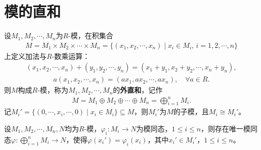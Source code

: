 \documentclass[../../main.tex]{subfiles}%
\begin{document}
\section{模的直和}

\begin{definition}
设$M_1,M_2,\cdots,M_n$为$R$-模，在积集合
\begin{align*}
M=M_1\times M_2\times\cdots\times M_n=\{(x_1,x_2,\cdots,x_n)\mid x_i\in M_i,\,i=1,2,\cdots,n\}
\end{align*}
上定义加法与$R$-数乘运算：
\begin{align}
(x_1,x_2,\cdots,x_n)+(y_1,y_2,\cdots,y_n)=(x_1+y_1,x_2+y_2,\cdots,x_n+y_n),\label{eq:5.2.1}
\end{align}
\begin{align}
a(x_1,x_2,\cdots,x_n)=(ax_1,ax_2,\cdots,ax_n),\quad \forall a\in R.\label{eq:5.2.2}
\end{align}
则$M$构成$R$-模，称为$M_1,M_2,\cdots,M_n$的\textbf{外直和}，记作
\begin{align*}
M=M_1\oplus M_2\oplus\cdots\oplus M_n=\bigoplus\limits_{i=1}^n M_i.
\end{align*}
记$M_i'=\{(0,\cdots,x_i,\cdots,0)\mid x_i\in M_i\}\subseteq M$，则$M_i'$为$M$的子模，且$M_i\cong M_i'$。
\end{definition}

\begin{theorem}
设$M_1,M_2,\cdots,M_n,N$均为$R$-模，$\varphi_i\colon M_i\to N$为模同态，$1\leqslant i\leqslant n$，则存在唯一模同态$\varphi\colon \bigoplus\limits_{i=1}^n M_i\to N$，使得$\varphi(x_i')=\varphi_i(x_i)$，其中$x_i'\in M_i'$，$1\leqslant i\leqslant n$。
\end{theorem}
\end{document}
